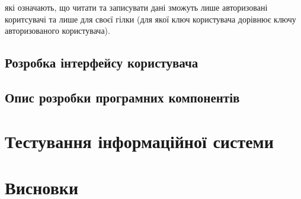\documentclass[../main.tex]{subfiles}
\begin{document}
які означають, що читати та записувати дані зможуть лише авторизовані коритсувачі та лише для своєї гілки (для якої ключ користувача дорівнює ключу авторизованого користувача).

\subsection{Розробка інтерфейсу користувача}

\subsection{Опис розробки програмних компонентів}

\section{Тестування інформаційної системи}


\section{Висновки}

	
\end{document}
